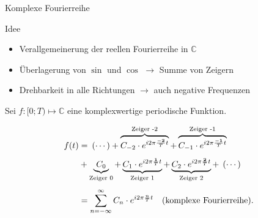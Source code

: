 \documentclass[12pt]{beamer}
\begin{document}
\begin{frame}{Komplexe Fourierreihe}
	\begin{block}{Idee}
		\begin{itemize}
			\item Verallgemeinerung der reellen Fourierreihe in $\mathbb{C}$
			\item Überlagerung von $\sin$ und $\cos$  $\rightarrow$ Summe von Zeigern
			\item Drehbarkeit in alle Richtungen $\rightarrow$ auch negative Frequenzen
		\end{itemize}
	\end{block}
	
	\pause
	
	Sei $f: [0;T) \mapsto \mathbb{C}$ eine komplexwertige periodische Funktion.
	
	\pause
	
	\vspace*{-.25cm}
	\begin{align*}
		f(t) &= \hspace*{.5ex} (\cdots) + \overbrace{C_{-2} \cdot e^{i 2\pi \frac{\mathbf{-2}}{T} t}}^{\text{Zeiger -2}} + \overbrace{C_{-1} \cdot e^{i 2\pi \frac{\mathbf{-1}}{T} t}}^{\text{Zeiger -1}} \\[1ex]
		     &+ \underbrace{C_{0}}_{\text{Zeiger 0}} + \underbrace{C_{1} \cdot e^{i 2\pi \frac{\mathbf{1}}{T} t}}_{\text{Zeiger 1}} + \underbrace{C_{2} \cdot e^{i 2\pi \frac{\mathbf{2}}{T} t}}_{\text{Zeiger 2}} + \hspace*{1ex} (\cdots) \\[1ex]
		     &= \sum_{n=-\infty}^\infty C_n \cdot e^{i 2\pi \frac{n}{T} t} \quad (\text{komplexe Fourierreihe}).
	\end{align*}
\end{frame}
\end{document}
